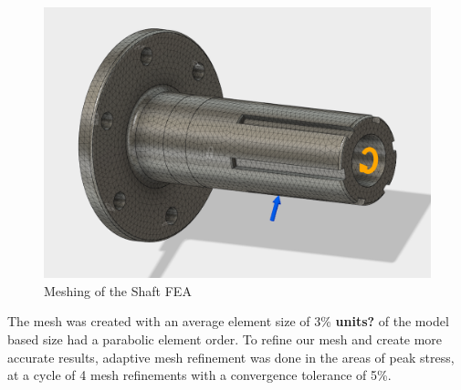\documentclass[main.tex]{subfiles}
\begin{document}
    \begin{figure}[H]
        \centering
        \includegraphics[width=\linewidth]{images/fig15}
        \caption{Meshing of the Shaft FEA}
    \end{figure}
    The mesh was created with an average element size of 3\% \textbf{units?} of the model based size had a parabolic element order. To refine our mesh and create more accurate results, adaptive mesh refinement was done in the areas of peak stress, at a cycle of 4 mesh refinements with a convergence tolerance of 5\%.
\end{document}
